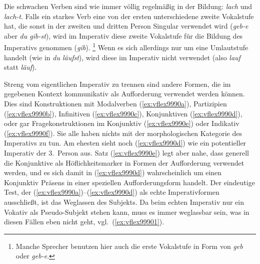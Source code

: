 Die schwachen Verben sind wie immer völlig regelmäßig in der Bildung: \textit{lach} und \textit{lach-t}.
Falls ein starkes Verb eine von der ersten unterschiedene zweite Vokalstufe hat, die sonst in der zweiten und dritten Person Singular verwendet wird (\textit{geb-e} aber \textit{du gib-st}), wird im Imperativ diese zweite Vokalstufe für die Bildung des Imperativs genommen (\textit{gib}).%
\footnote{Manche Sprecher benutzen hier auch die erste Vokalstufe in Form von \textit{geb} oder \textit{geb-e}.}
Wenn es sich allerdings nur um eine Umlautstufe handelt (wie in \textit{du läufst}), wird diese im Imperativ nicht verwendet (also \textit{lauf} statt \textit{\Ast läuf}).

Streng vom eigentlichen Imperativ zu trennen sind andere Formen, die im gegebenen Kontext kommunikativ als Aufforderung verwendet werden können.
Dies sind \zB Konstruktionen mit Modalverben (\ref{ex:vflex9990a}), Partizipien (\ref{ex:vflex9990b}), Infinitiven (\ref{ex:vflex9990c}), Konjunktiven (\ref{ex:vflex9990d}), oder gar Fragekonstruktionen im Konjunktiv (\ref{ex:vflex9990e}) oder Indikativ (\ref{ex:vflex9990f}).
Sie alle haben nichts mit der morphologischen Kategorie des Imperativs zu tun.
Am ehesten sieht noch (\ref{ex:vflex9990d}) wie ein potentieller Imperativ der 3.~Person aus.
Satz (\ref{ex:vflex9990e}) legt aber nahe, dass generell die Konjunktive als Höflichkeitsmarker in Formen der Aufforderung verwendet werden, und es sich damit in (\ref{ex:vflex9990d}) wahrscheinlich um einen Konjunktiv Präsens in einer speziellen Aufforderungsform handelt.
Der eindeutige Test, der (\ref{ex:vflex9990a})--(\ref{ex:vflex9990d}) als echte Imperativformen ausschließt, ist das Weglassen des Subjekts.
Da beim echten Imperativ nur ein Vokativ als Pseudo-Subjekt stehen kann, muss es immer weglassbar sein, was in diesen Fällen eben nicht geht, vgl.\ (\ref{ex:vflex99901}). 

\begin{exe}
  \ex\label{ex:vflex9990}
    \begin{xlist}
    \end{xlist}
  \ex\label{ex:vflex99901}
    \begin{xlist}
    \end{xlist}
\end{exe}

